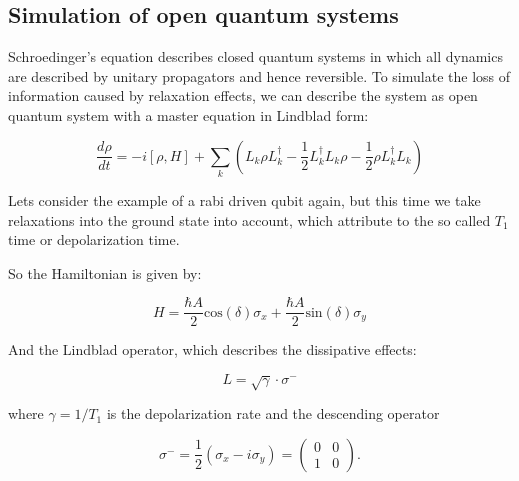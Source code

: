 \documentclass[letterpaper,10pt,english]{sphinxmanual}
\begin{document}
\subsection{Simulation of open quantum systems}
\label{\detokenize{examples/open_quantum_systems:Simulation-of-open-quantum-systems}}\label{\detokenize{examples/open_quantum_systems::doc}}
Schroedinger’s equation describes closed quantum systems in which all dynamics are described by unitary propagators and hence reversible. To simulate the loss of information caused by relaxation effects, we can describe the system as open quantum system with a master equation in Lindblad form:

\begin{equation}
\frac{d\rho}{dt}=-i[\rho, H] + \sum_k \left( L_k \rho L_k^\dagger
- \frac{1}{2} L_k^\dagger L_k \rho
- \frac{1}{2} \rho L_k^\dagger L_k \right)
\end{equation}

Lets consider the example of a rabi driven qubit again, but this time we take relaxations into the ground state into account, which attribute to the so called \(T_1\)\sphinxhyphen{}time or depolarization time.

So the Hamiltonian is given by:

\begin{equation}
H = \frac{\hbar A}{2} \text{cos} (\delta ) \sigma_x
+ \frac{\hbar A}{2} \text{sin} (\delta ) \sigma_y
\end{equation}

And the Lindblad operator, which describes the dissipative effects:

\begin{equation}
L = \sqrt{\gamma} \cdot \sigma^-
\end{equation}

where \(\gamma = 1 / T_1\) is the depolarization rate and the descending operator

\begin{equation}
\sigma^- = \frac{1}{2} (\sigma_x - i \sigma_y)  =
\begin{pmatrix}
0 & 0 \\
1 & 0
\end{pmatrix}.
\end{equation}
\end{document}
